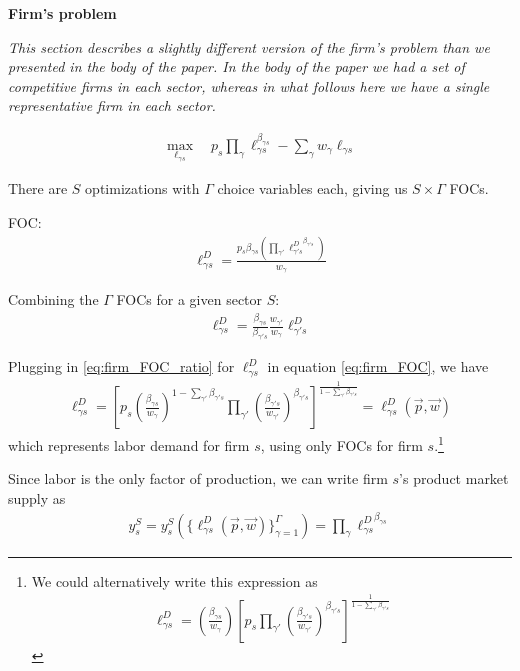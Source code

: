\documentclass[12pt]{article}
\def\g{\gamma}
\theoremstyle{definition}
\theoremstyle{plain}
\begin{document}
\textbf{Firm's problem}


\emph{This section describes a slightly different version of the firm's problem than we presented in the body of the paper. In the body of the paper we had a set of competitive firms in each sector, whereas in what follows here we have a single representative firm in each sector. }

\begin{align}
\max_{\ell_{\g s}} \quad p_s \prod_{\g} \ell_{\g s}^{\beta_{\g s}} - \sum_{\g} w_{\g} \ell_{\g s}
\end{align}

There are $S$ optimizations with $\Gamma$ choice variables each, giving us $S \times \Gamma$ FOCs.

FOC:
\begin{align}
\ell_{\g s}^D = \frac{p_s \beta_{\g s}\left( \prod_{\g'} {\ell_{\g' s}^D}^{\beta_{\g' s}}\right)}{w_{\g}} \label{eq:firm_FOC}
\end{align}

Combining the $\Gamma$ FOCs for a given sector $S$:
\begin{align}
\ell_{\g s}^D = \frac{\beta_{\g s}}{\beta_{\g' s}}\frac{w_{\g'}}{w_{\g}} \ell_{\g's}^D \label{eq:firm_FOC_ratio}
\end{align}

Plugging in \ref{eq:firm_FOC_ratio} for $\ell_{\g s}^D$ in equation \ref{eq:firm_FOC}, we have
\begin{align}
\ell_{\g s}^D = \left[ p_s \left( \frac{\beta_{\g s}}{w_{\g }} \right)^{1-\sum_{\g'} \beta_{\g' s}} \prod_{\g'} \left(\frac{\beta_{\g' s}}{w_{\g'}} \right)^{\beta_{\g' s}} \right]^{\frac{1}{1-\sum_{\g'} \beta_{\g' s}}} = \ell_{\g s}^D \left(\vec{p}, \vec{w} \right) \label{eq:labor_demand}
\end{align}
which represents labor demand for firm $s$, using only FOCs for firm $s$.\footnote{We could alternatively write this expression as 
	\begin{align*}
	\ell_{\g s}^D =   \left( \frac{\beta_{\g s}}{w_{\g }} \right) \left[ p_s \prod_{\g'}  \left(\frac{\beta_{\g' s}}{w_{\g'}} \right)^{\beta_{\g' s}} \right]^{\frac{1}{1-\sum_{\g'} \beta_{\g' s}}}
	\end{align*}
	}

Since labor is the only factor of production, we can write firm $s$'s product market supply as 
\begin{align}
y_s^S = y_s^S\left( \{\ell_{\g s}^D (\vec{p}, \vec{w}) \}_{\g=1}^{\Gamma} \right) = \prod_{\g} {\ell_{\g s}^D}^{\beta_{\g s}} \label{eq:product_supply}
\end{align}
\end{document}
